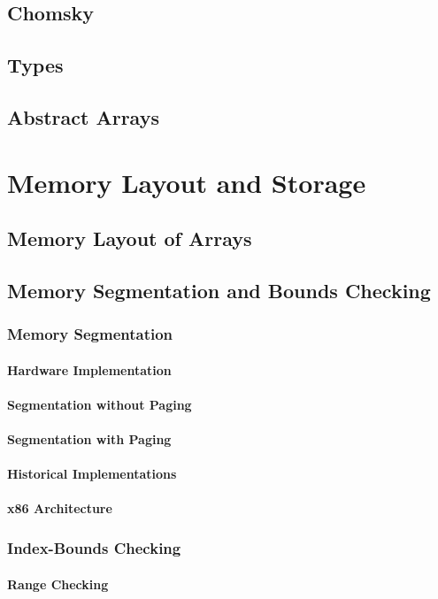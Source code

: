 \documentclass[12pt, oneside]{book}
\begin{document}
\section{Chomsky}
\section{Types}
\section{Abstract Arrays}
\chapter{Memory Layout and Storage}
\section{Memory Layout of Arrays}
\section{Memory Segmentation and Bounds Checking}
\subsection{Memory Segmentation}
\subsubsection{Hardware Implementation}
\subsubsection{Segmentation without Paging}
\subsubsection{Segmentation with Paging}
\subsubsection{Historical Implementations}
\subsubsection{x86 Architecture}
\subsection{Index-Bounds Checking}
\subsubsection{Range Checking}
\end{document}
